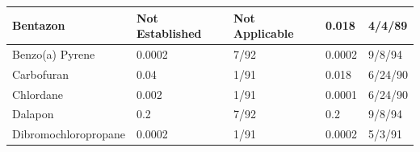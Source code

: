 \begin{table}[]
\begin{tabular}{|l|l|l|l|l|}
Bentazon                                                                   & Not   Established                                                  & Not   Applicable                                                                                                  & 0.018                                                                                        & 4/4/89                                           \\ \hline
Benzo(a)   Pyrene                                                          & 0.0002                                                             & 7/92                                                                                                              & 0.0002                                                                                       & 9/8/94                                           \\ \hline
Carbofuran                                                                 & 0.04                                                               & 1/91                                                                                                              & 0.018                                                                                        & 6/24/90                                          \\ \hline
Chlordane                                                                  & 0.002                                                              & 1/91                                                                                                              & 0.0001                                                                                       & 6/24/90                                          \\ \hline
Dalapon                                                                    & 0.2                                                                & 7/92                                                                                                              & 0.2                                                                                          & 9/8/94                                           \\ \hline
Dibromochloropropane                                                       & 0.0002                                                             & 1/91                                                                                                              & 0.0002                                                                                       & 5/3/91                                           \\ \hline

\end{tabular}
\end{table}
